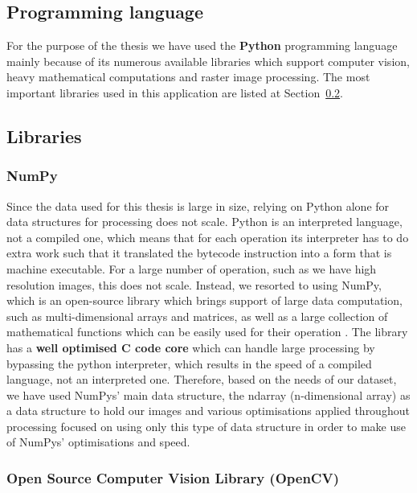 \documentclass[12pt, a4paper]{report}
\begin{document}
	\subsection{Programming language}
	\label{seq:programminglang}
	
	\par For the purpose of the thesis we have used the \textbf{Python} programming language mainly because of its numerous available libraries which support computer vision, heavy mathematical computations and raster image processing. The most important libraries used in this application are listed at Section~\ref{seq:libraries}.
	
	\subsection{Libraries}
	\label{seq:libraries}
	
	\subsubsection{NumPy}
	
	\par Since the data used for this thesis is large in size, relying on Python alone for data structures for processing does not scale. Python is an interpreted language, not a compiled one, which means that for each operation its interpreter has to do extra work such that it translated the bytecode instruction into a form that is machine executable. For a large number of operation, such as we have high resolution images, this does not scale. Instead, we resorted to using NumPy, which is an open-source library which brings support of large data computation, such as multi-dimensional arrays and matrices, as well as a large collection of mathematical functions which can be easily used for their operation \cite{arraynumpy}. The library has a \textbf{well optimised C code core} which can handle large processing by bypassing the python interpreter, which results in the speed of a compiled language, not an interpreted one. Therefore, based on the needs of our dataset, we have used NumPys' main data structure, the ndarray (n-dimensional array) as a data structure to hold our images and various optimisations applied throughout processing focused on using only this type of data structure in order to make use of NumPys' optimisations and speed.
	
	\subsubsection{Open Source Computer Vision Library (OpenCV)}
	
\end{document}
